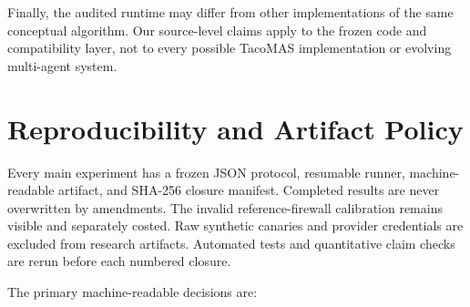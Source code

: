 \documentclass{article}
\begin{document}
Finally, the audited runtime may differ from other implementations of the same conceptual algorithm. Our source-level claims apply to the frozen code and compatibility layer, not to every possible TacoMAS implementation or evolving multi-agent system.

\section{Reproducibility and Artifact Policy}

Every main experiment has a frozen JSON protocol, resumable runner, machine-readable artifact, and SHA-256 closure manifest. Completed results are never overwritten by amendments. The invalid reference-firewall calibration remains visible and separately costed. Raw synthetic canaries and provider credentials are excluded from research artifacts. Automated tests and quantitative claim checks are rerun before each numbered closure.

The primary machine-readable decisions are:
\end{document}
